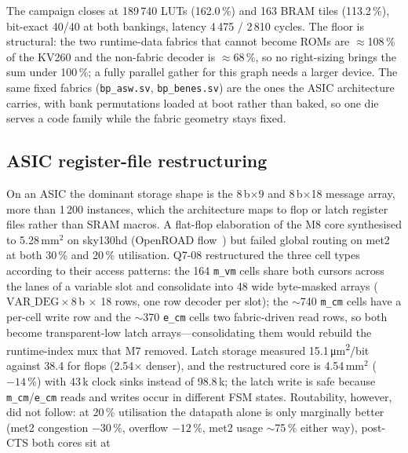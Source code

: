 The campaign closes at 189\,740 LUTs (162.0\,\%) and 163 BRAM tiles
(113.2\,\%), bit-exact 40/40 at both bankings, latency 4\,475 / 2\,810
cycles. The floor is structural: the two runtime-data fabrics that cannot
become ROMs are $\approx$108\,\% of the KV260 and the non-fabric decoder is
$\approx$68\,\%, so no right-sizing brings the sum under 100\,\%; a
fully parallel gather for this graph needs a larger device.
The same fixed fabrics (\texttt{bp\_asw.sv}, \texttt{bp\_benes.sv}) are the
ones the ASIC architecture carries, with bank permutations loaded at boot
rather than baked, so one die serves a code family while the fabric
geometry stays fixed.

\subsection*{ASIC register-file restructuring}
On an ASIC the dominant storage shape is the 8\,b$\times$9 and
8\,b$\times$18 message array, more than 1\,200 instances, which the
architecture maps to flop or latch register files rather than SRAM macros.
A flat-flop elaboration of the M8 core synthesised to 5.28\,mm$^2$ on
sky130hd (OpenROAD flow~\citep{openroad}) but failed global routing on
met2 at both 30\,\% and 20\,\% utilisation. Q7-08 restructured the three
cell types according to their access patterns: the 164 \texttt{m\_vm} cells
share both cursors across the lanes of a variable slot and consolidate into
48 wide byte-masked arrays ($\mathrm{VAR\_DEG}\times 8$\,b $\times$ 18 rows,
one row decoder per slot); the $\sim$740 \texttt{m\_cm} cells have a
per-cell write row and the $\sim$370 \texttt{e\_cm} cells two fabric-driven
read rows, so both become transparent-low latch arrays---consolidating them
would rebuild the runtime-index mux that M7 removed. Latch storage measured
15.1\,\si{\micro\metre\squared}/bit against 38.4 for flops (2.54$\times$
denser), and the restructured core is 4.54\,mm$^2$ ($-14\,\%$) with 43\,k
clock sinks instead of 98.8\,k; the latch write is safe because
\texttt{m\_cm}/\texttt{e\_cm} reads and writes occur in different FSM
states.
Routability, however, did not follow: at 20\,\% utilisation the datapath
alone is only marginally better (met2 congestion $-30\,\%$, overflow
$-12\,\%$, met2 usage $\sim$75\,\% either way), post-CTS both cores sit at
